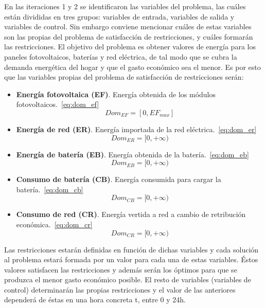 En las iteraciones 1 y 2 se identificaron las variables del problema, las cuáles están divididas en tres grupos: variables de entrada, variables de salida y variables de control. Sin embargo conviene mencionar cuáles de estas variables son las propias del problema de satisfacción de restricciones, y cuáles formarán las restricciones. El objetivo del problema es obtener valores de energía para los paneles fotovoltaicos, baterías y red eléctrica, de tal modo que se cubra la demanda energética del hogar y que el gasto económico sea el menor. Es por esto que las variables propias del problema de satisfacción de restricciones serán:
\begin{itemize}
\item \textbf{Energía fotovoltaica (EF)}. Energía obtenida de los módulos fotovoltaicos.~\ref{eq:dom_ef}
\begin{equation}
        \label{eq:dom_ef}
        Dom_{EF} = [0, EF_{max}]
\end{equation}
\item \textbf{Energía de red (ER)}. Energía importada de la red eléctrica.~\ref{eq:dom_er}
\begin{equation}
        \label{eq:dom_er}
        Dom_{ER} = [0, +\infty)
\end{equation}
\item \textbf{Energía de batería (EB)}. Energía obtenida de la batería.~\ref{eq:dom_eb}
\begin{equation}
        \label{eq:dom_eb}
        Dom_{EB} = [0, +\infty)
\end{equation}
\item \textbf{Consumo de batería (CB)}. Energía consumida para cargar la batería.~\ref{eq:dom_cb}
\begin{equation}
        \label{eq:dom_cb}
        Dom_{CB} = [0, +\infty)
\end{equation}
\item \textbf{Consumo de red (CR)}. Energía vertida a red a cambio de retribución económica.~\ref{eq:dom_cr}
\begin{equation}
        \label{eq:dom_cr}
        Dom_{CR} = [0, +\infty)
\end{equation}
\end{itemize}

Las restricciones estarán definidas en función de dichas variables y cada solución al problema estará formada por un valor para cada una de estas variables. Éstos valores satisfacen las restricciones y además serán los óptimos para que se produzca el menor gasto económico posible. El resto de variables (variables de control) determinarán las propias restricciones y el valor de las anteriores dependerá de éstas en una hora concreta t, entre 0 y 24h.\\

